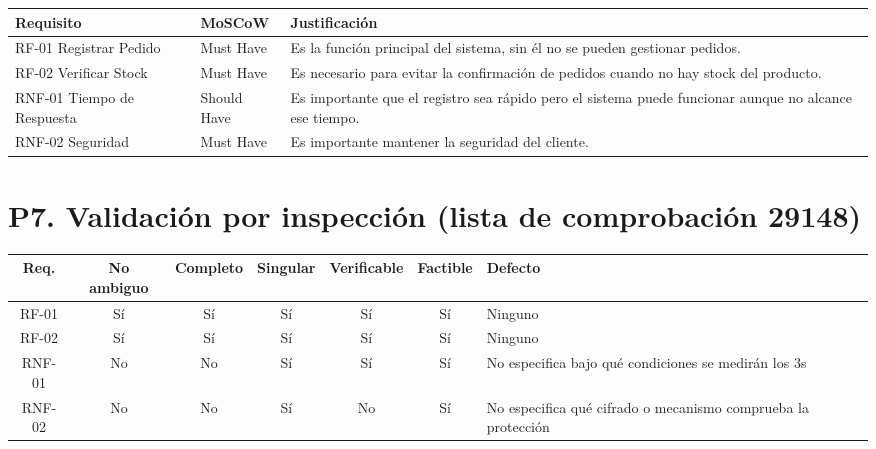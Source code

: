 \documentclass[12pt,a4paper]{article}
\begin{document}
\begin{table}[H]
\centering
\small

\begin{tabularx}{\textwidth}{
|>{\raggedright\arraybackslash}p{3.4cm}
|>{\centering\arraybackslash}p{2.2cm}
|>{\raggedright\arraybackslash}X|
}
\hline

\textbf{Requisito} &
\textbf{MoSCoW} &
\textbf{Justificación} \\
\hline

RF-01 Registrar Pedido &
Must Have &
Es la función principal del sistema, sin él no se pueden gestionar pedidos. \\
\hline

RF-02 Verificar Stock &
Must Have &
Es necesario para evitar la confirmación de pedidos cuando no hay
stock del producto. \\
\hline

RNF-01 Tiempo de Respuesta &
Should Have &
Es importante que el registro sea rápido pero el sistema puede
funcionar aunque no alcance ese tiempo. \\
\hline

RNF-02 Seguridad &
Must Have &
Es importante mantener la seguridad del cliente. \\
\hline

\end{tabularx}
\end{table}


\section*{P7. Validación por inspección (lista de comprobación 29148)}

\begin{table}[H]
\centering
\footnotesize

\begin{tabularx}{\textwidth}{
|c|c|c|c|c|c|>{\raggedright\arraybackslash}X|
}
\hline

\textbf{Req.} &
\textbf{No ambiguo} &
\textbf{Completo} &
\textbf{Singular} &
\textbf{Verificable} &
\textbf{Factible} &
\textbf{Defecto} \\
\hline

RF-01 &
Sí &
Sí &
Sí &
Sí &
Sí &
Ninguno \\
\hline

RF-02 &
Sí &
Sí &
Sí &
Sí &
Sí &
Ninguno \\
\hline

RNF-01 &
No &
No &
Sí &
Sí &
Sí &
No especifica bajo qué condiciones se medirán los 3s \\
\hline

RNF-02 &
No &
No &
Sí &
No &
Sí &
No especifica qué cifrado o mecanismo comprueba la protección \\
\hline

\end{tabularx}
\end{table}
\end{document}
